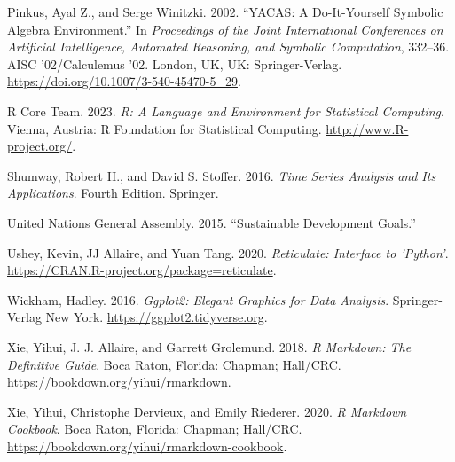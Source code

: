 \begin{cslreferences}
\leavevmode\hypertarget{ref-Pinkus2002}{}%
Pinkus, Ayal Z., and Serge Winitzki. 2002. ``YACAS: A Do-It-Yourself Symbolic Algebra Environment.'' In \emph{Proceedings of the Joint International Conferences on Artificial Intelligence, Automated Reasoning, and Symbolic Computation}, 332--36. AISC '02/Calculemus '02. London, UK, UK: Springer-Verlag. \url{https://doi.org/10.1007/3-540-45470-5_29}.

\leavevmode\hypertarget{ref-R}{}%
R Core Team. 2023. \emph{R: A Language and Environment for Statistical Computing}. Vienna, Austria: R Foundation for Statistical Computing. \url{http://www.R-project.org/}.

\leavevmode\hypertarget{ref-shumway:etal:16}{}%
Shumway, Robert H., and David S. Stoﬀer. 2016. \emph{Time Series Analysis and Its Applications}. Fourth Edition. Springer.

\leavevmode\hypertarget{ref-UN17}{}%
United Nations General Assembly. 2015. ``Sustainable Development Goals.''

\leavevmode\hypertarget{ref-reticulate}{}%
Ushey, Kevin, JJ Allaire, and Yuan Tang. 2020. \emph{Reticulate: Interface to 'Python'}. \url{https://CRAN.R-project.org/package=reticulate}.

\leavevmode\hypertarget{ref-ggplot2}{}%
Wickham, Hadley. 2016. \emph{Ggplot2: Elegant Graphics for Data Analysis}. Springer-Verlag New York. \url{https://ggplot2.tidyverse.org}.

\leavevmode\hypertarget{ref-RMarkdownDefinitiveGuide}{}%
Xie, Yihui, J. J. Allaire, and Garrett Grolemund. 2018. \emph{R Markdown: The Definitive Guide}. Boca Raton, Florida: Chapman; Hall/CRC. \url{https://bookdown.org/yihui/rmarkdown}.

\leavevmode\hypertarget{ref-RMarkdownCookbook}{}%
Xie, Yihui, Christophe Dervieux, and Emily Riederer. 2020. \emph{R Markdown Cookbook}. Boca Raton, Florida: Chapman; Hall/CRC. \url{https://bookdown.org/yihui/rmarkdown-cookbook}.
\end{cslreferences}



\address{%
Mikkel Meyer Andersen\\
Department of Mathematical Sciences, Aalborg University, Denmark\\%
Skjernvej 4A\\ 9220 Aalborg Ø, Denmark\\
%
%
\textit{ORCiD: \href{https://orcid.org/0000-0002-0234-0266}{0000-0002-0234-0266}}\\%
\href{mailto:mikl@math.aau.dk}{\nolinkurl{mikl@math.aau.dk}}%
}

\address{%
Søren Højsgaard\\
Department of Mathematical Sciences, Aalborg University, Denmark\\%
Skjernvej 4A\\ 9220 Aalborg Ø, Denmark\\
%
%
\textit{ORCiD: \href{https://orcid.org/0000-0002-3269-9552}{0000-0002-3269-9552}}\\%
\href{mailto:sorenh@math.aau.dk}{\nolinkurl{sorenh@math.aau.dk}}%
}
